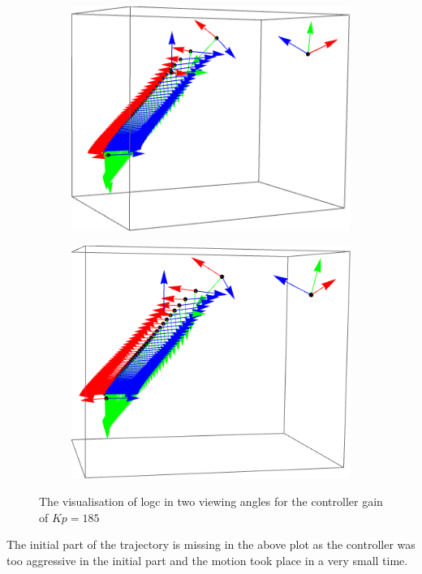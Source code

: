 \documentclass[a4paper,12pt]{article}
\begin{document}
\begin{figure}[H]
	\centering
	\begin{subfigure}
		\centering
		\includegraphics[scale=0.5]{diffc_185}
		\label{fg:logc_se_185}
	\end{subfigure}
	\begin{subfigure}
		\centering
		\includegraphics[scale=0.5]{diffc_185_2}
		\label{fg:logc_se_2_185}
	\end{subfigure}
	\caption{The \SE visualisation of logc in two viewing angles for the controller gain of $Kp=185$}
\end{figure}

The initial part of the trajectory is missing in the above plot as the controller was too aggressive in the initial part and the motion took place in a very small time.
\end{document}
